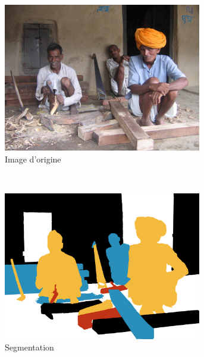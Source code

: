 \begin{figure}[htb]
	\centering
	 \begin{subfigure}[t]{0.3\textwidth}	
			\includegraphics[width=0.95\textwidth]{images/sur-segmentation/HSID/dataset_creation_step0}
		 \caption{Image d'origine}
		 \label{fig:dataset_creation_step0}
	\end{subfigure}		
	~
	 \begin{subfigure}[t]{0.3\textwidth}	
			\includegraphics[width=0.95\textwidth]{images/sur-segmentation/HSID/dataset_creation_step1}
		 \caption{Segmentation}
		 \label{fig:dataset_creation_step1}
	\end{subfigure}	
	~
	 \begin{subfigure}[t]{0.3\textwidth}	

\end{subfigure}
\end{figure}
